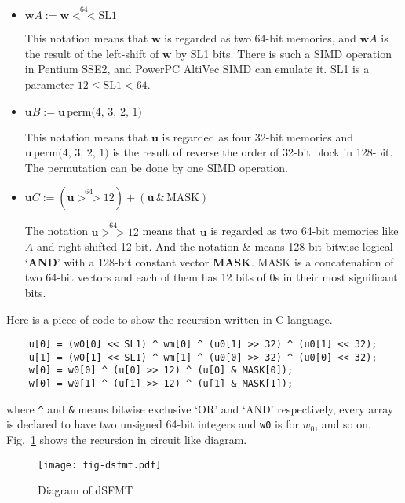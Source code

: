 \documentclass{svmult}
\begin{document}
\begin{itemize}
\item 
  $\mathbf{w} A := \mathbf{w} \stackrel{64}{<<} \textrm{SL1}$

  This notation means that $\mathbf{w}$ is regarded as two 
  64-bit memories, and $\mathbf{w} A$ is the result of the left-shift
  of $\mathbf{w}$ by SL1 bits. There is such a SIMD operation in 
  Pentium SSE2, and PowerPC AltiVec SIMD can emulate it.
  SL1 is a parameter $12 \le \textrm{SL1} < 64$.

\item
  $\mathbf{u} B := \mathbf{u}\,\textrm{perm(4, 3, 2, 1)}$

  This notation means that $\mathbf{u}$ is regarded as four
  32-bit memories and $\mathbf{u}\,\textrm{perm(4, 3, 2, 1)}$ is
  the result of reverse the order of 32-bit block in 128-bit.
  The permutation can be done by one SIMD operation.

\item 
  $\mathbf{u} C := (\mathbf{u} \stackrel{64}{>>} 12) 
  + (\mathbf{u}\, \& \,\textrm{MASK})$

  The notation $\mathbf{u} \stackrel{64}{>>} 12$ means that
  $\mathbf{u}$ is regarded as two 64-bit memories like $A$ and
  right-shifted 12 bit.  And the notation $\&$ means 128-bit
  bitwise logical `\textbf{AND}' with a 128-bit constant vector \textbf{MASK}.
  MASK is a concatenation of two 64-bit vectors and each of them has
  12 bits of 0s in their most significant bits.

\end{itemize}
Here is a piece of code to show the recursion written in C language.
\begin{verbatim}
    u[0] = (w0[0] << SL1) ^ wm[0] ^ (u0[1] >> 32) ^ (u0[1] << 32);
    u[1] = (w0[1] << SL1) ^ wm[1] ^ (u0[0] >> 32) ^ (u0[0] << 32);
    w[0] = w0[0] ^ (u[0] >> 12) ^ (u[0] & MASK[0]);
    w[0] = w0[1] ^ (u[1] >> 12) ^ (u[1] & MASK[1]);
\end{verbatim}
where \texttt{\^} and \texttt{\&} means bitwise exclusive `OR' and
`AND' respectively, every array is declared to have two unsigned
64-bit integers and \texttt{w0} is for $w_0$, and so
on. Fig.~\ref{fig:dsfmt} shows the recursion in circuit like diagram.

\begin{figure}
  \begin{center}
    \texttt{[image: fig-dsfmt.pdf]}
    \caption{Diagram of dSFMT}
    \label{fig:dsfmt}
  \end{center}
\end{figure}
\end{document}
